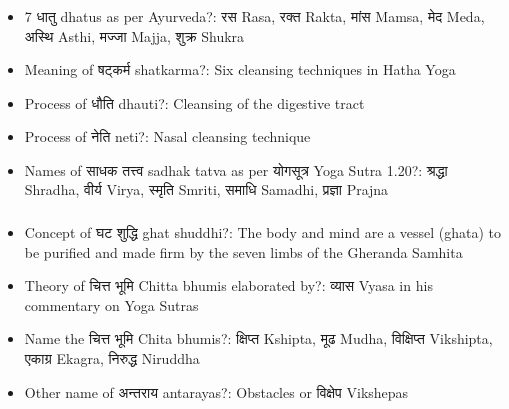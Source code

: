 \begin{frame}[fragile]\frametitle{}
\begin{itemize}
\item 7 धातु dhatus as per Ayurveda?: रस Rasa, रक्त Rakta, मांस Mamsa, मेद Meda, अस्थि Asthi, मज्जा Majja, शुक्र Shukra
\item Meaning of षट्कर्म shatkarma?: Six cleansing techniques in Hatha Yoga
\item Process of धौति dhauti?: Cleansing of the digestive tract
\item Process of नेति neti?: Nasal cleansing technique
\item Names of साधक तत्त्व sadhak tatva as per योगसूत्र Yoga Sutra 1.20?: श्रद्धा Shradha, वीर्य Virya, स्मृति Smriti, समाधि Samadhi, प्रज्ञा Prajna
\end{itemize}
\end{frame}

\begin{frame}[fragile]\frametitle{}
\begin{itemize}
\item Concept of घट शुद्धि ghat shuddhi?: The body and mind are a vessel (ghata) to be purified and made firm by the seven limbs of the Gheranda Samhita
\item Theory of चित्त भूमि Chitta bhumis elaborated by?: व्यास Vyasa in his commentary on Yoga Sutras
\item Name the चित्त भूमि Chita bhumis?: क्षिप्त Kshipta, मूढ Mudha, विक्षिप्त Vikshipta, एकाग्र Ekagra, निरुद्ध Niruddha
\item Other name of अन्तराय antarayas?: Obstacles or विक्षेप Vikshepas
\end{itemize}
\end{frame}

